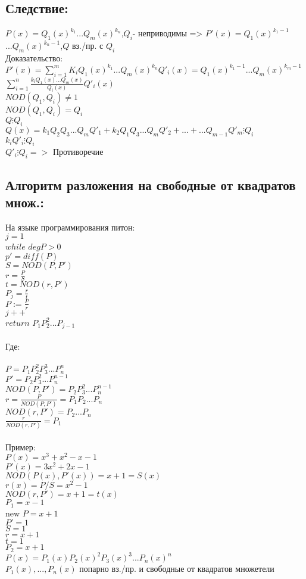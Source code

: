 \documentclass[12pt]{article}
\begin{document}
\subsection{Следствие:}
\noindent $P(x)=Q_1(x)^{k_1}$$... Q_m(x)^{k_n}$,$Q_i$- неприводимы => $P'(x)=Q_1(x)^{k_1-1}$$... Q_m(x)^{k_n-1}$,$Q$ вз./пр. с $Q_i$
\\Доказательство:
\\$P'(x)=\sum\limits _{i=1}^{m} K_iQ_1(x)^{k_1}$$...Q_m(x)^{k_n}$$Q'_i(x)=Q_1(x)^{k_1-1}$$...Q_m(x)^{k_m-1}$$\sum\limits _{i=1}^{n}\frac{k_iQ_1(x)...Q_m(x)}{Q_i(x)}Q'_i(x)$
\\$NOD(Q_1,Q_i)\neq 1$
\\$NOD(Q_1,Q_i) = Q_i$
\\$Q \vdots Q_i$
\\$Q(x)= k_1Q_2Q_3...Q_mQ'_1+k_2Q_1Q_3...Q_mQ'_2+...+...Q_{m-1}Q'_m\vdots Q_i$
\\$k_iQ'_i\vdots Q_i$
\\$Q'_i\vdots Q_i =>$ Противоречие 
\subsection{Алгоритм разложения на свободные от  квадратов множ.:}
\noindent На языке программирования питон: 
\\$j=1$
\\$while$ $deg P>0$
\\$p' = diff(P)$
\\$S=NOD(P,P')$
\\$r = \frac{P}{S}$
\\$t = NOD(r,P')$
\\$P_j=\frac{r}{t}$
\\$P:=\frac{P}{r}$
\\$j++$
\\$return$ $P_1P^2_2...P_{j-1}$
\\
\\Где:
\\
\\$P=P_1P^2_2P^3_3...P^n_n$
\\$P'=P_2P^2_3...P_n^{n-1}$
\\$NOD(P,P')=P_2P_3^2...P_n^{n-1}$
\\$r=\frac{P}{NOD(P,P')}=P_1P_2...P_n$
\\$NOD(r,P')=P_2...P_n$
\\$\frac{r}{NOD(r,P')}=P_1$
\\
\\Пример:
\\$P(x)=x^3+x^2-x-1$
\\$P'(x)=3x^2+2x-1$
\\$NOD(P(x),P'(x))=x+1=S(x)$
\\$r(x)= P/S=x^2-1$
\\$NOD(r,P')=x+1=t(x)$
\\$P_1=x-1$
\\new $P=x+1$
\\$P'=1$
\\$S=1$
\\$r = x+1$
\\$t = 1$
\\$P_2=x+1$
\\$P(x) = P_1(x)P_2(x)^2P_3(x)^3...P_n(x)^n$
\\$P_1(x),...,P_n(x)$ попарно вз./пр. и свободные от квадратов множетели
\end{document}
